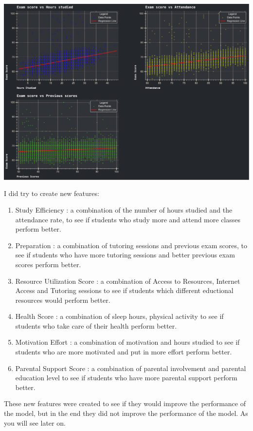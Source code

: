 \documentclass{assignment}
\begin{document}
\begin{center}
    \includegraphics[width=5.5in]{../report/assets/scatter_plots_exploration.pdf}
\end{center}
I did try to create new features:
\begin{enumerate}
    \item Study Efficiency : a combination of the number of hours studied and the attendance rate, to see if students who study more and attend more classes perform better.
    \item Preparation : a combination of tutoring sessions and previous exam scores, to see if students who have more tutoring sessions and better previous exam scores perform better.
    \item Resource Utilization Score : a combination of Access to Resources, Internet Access and Tutoring sessions to see if students which different eductional resources would perform better.
    \item Health Score : a combination of sleep hours, physical activity to see if students who take care of their health perform better.
    \item Motivation Effort : a combination of motivation and hours studied to see if students who are more motivated and put in more effort perform better.
    \item Parental Support Score : a combination of parental involvement and parental education level to see if students who have more parental support perform better.
\end{enumerate} 
These new features were created to see if they would improve the performance of the model, but in the end they did not improve the performance of the model. As you will see later on.
\end{document}
